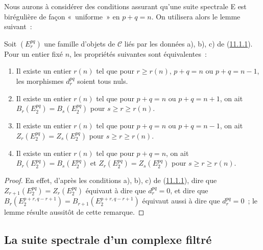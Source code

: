 \begin{env}[11.1.9]
\label{0.11.1.9-fr}
Nous aurons à considérer des conditions assurant qu'une suite spectrale E est
birégulière de façon «~uniforme~» en $p+q=n$. On utilisera alors le lemme
suivant~:
\end{env}

\begin{lemma}[11.1.10]
\label{0.11.1.10-fr}
Soit $(E_r^{pq})$ une famille d'objets de $\mathcal C$ liés par les données
a), b), c) de (\hyperref[0.11.1.1-fr]{11.1.1}). Pour un entier fixé $n$, les
propriétés suivantes sont équivalentes~:
\begin{enumerate}
  \item[(a)] Il existe un entier $r(n)$ tel que pour $r\geq r(n)$,
    $p+q=n$ ou $p+q=n-1$, les morphismes $d_r^{pq}$ soient tous nuls.
  \item[(b)] Il existe un entier $r(n)$ tel que pour $p+q=n$ ou $p+q=n+1$,
    on ait $B_r(E_2^{pq})=B_s(E_2^{pq})$ pour $s\geq r\geq r(n)$.
  \item[(c)] Il existe un entier $r(n)$ tel que pour $p+q=n$ ou $p+q=n-1$,
    on ait $Z_r(E_2^{pq})=Z_s(E_2^{pq})$ pour $s\geq r\geq r(n)$.
  \item[(d)] Il existe un entier $r(n)$ tel que pour $p+q=n$, on ait
    $B_r(E_2^{pq})=B_s(E_2^{pq})$ et $Z_r(E_2^{pq})=Z_s(E_2^{pq})$ pour
    $s\geq r\geq r(n)$.
\end{enumerate}
\end{lemma}

\begin{proof}
En effet, d'après les conditions a), b), c) de
(\hyperref[0.11.1.1-fr]{11.1.1}), dire que
$Z_{r+1}(E_2^{pq})=Z_r(E_2^{pq})$ équivaut à dire que $d_r^{pq}=0$, et dire
que
$B_r(E_2^{p+r,q-r+1})=B_{r+1}(E_2^{p+r,q-r+1})$ équivaut aussi à dire que
$d_r^{pq}=0$~; le lemme résulte aussitôt de cette remarque.
\end{proof}
\subsection{La suite spectrale d'un complexe filtré}
\label{subsection:0.11.2-fr}

